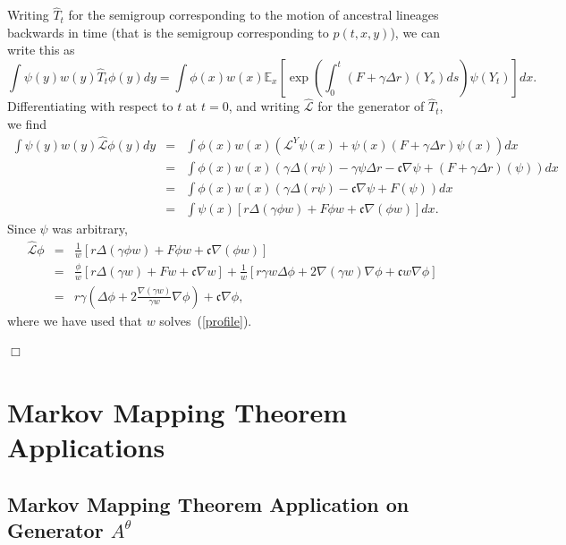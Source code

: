 \documentclass[12pt]{article}
\newenvironment {proof}{{\noindent\bf Proof }}{\hfill $\Box$ \medskip}
\def \hat{\widehat}
\newcommand{\IE}{\mathbb E}
\begin{document}
\begin{proof}
Writing $\hat{T}_t$ for the semigroup corresponding to the motion of 
ancestral lineages backwards in time (that is the semigroup corresponding
to $p(t,x,y)$), we can write this as 
$$\int \psi(y)w(y)\hat{T}_t\phi(y)dy=\int\phi(x)w(x)
\IE_x\left[\exp\left(\int_0^t(F+\gamma\Delta r)(Y_s)ds\right)\psi(Y_t)\right]dx.$$
Differentiating with respect to $t$ at $t=0$, and writing 
$\hat{\mathcal L}$ for the generator of $\hat{T}_t$, we find
\begin{eqnarray*}
\int \psi(y)w(y)\widehat{\mathcal L}\phi(y)dy&=&
\int\phi(x)w(x)\left({\mathcal L}^Y\psi(x)+\psi(x)(F+\gamma\Delta r)\psi(x)\right)dx\\
&=&\int\phi(x)w(x)\left(\gamma\Delta(r\psi)-\gamma\psi\Delta r -\mathfrak{c}\nabla\psi 
+(F+\gamma\Delta r)(\psi)\right)dx\\
&=&\int\phi(x)w(x)\left(\gamma\Delta(r\psi)-\mathfrak{c}\nabla\psi+F(\psi)\right)dx\\
&=&
\int\psi(x)\left[r\Delta(\gamma \phi w)+F\phi w+\mathfrak{c}\nabla(\phi w)\right]dx.
\end{eqnarray*}
Since $\psi$ was arbitrary,
\begin{eqnarray*}
\hat{\mathcal L}\phi&=&\frac{1}{w}\left[ r\Delta (\gamma\phi w)+F\phi w
+\mathfrak{c}\nabla(\phi w)\right]\\
&=&\frac{\phi}{w}\left[r\Delta(\gamma w)+Fw+\mathfrak{c}\nabla w\right]
+\frac{1}{w}\left[r\gamma w\Delta \phi +2\nabla (\gamma w)
\nabla\phi+\mathfrak{c}w\nabla\phi\right]\\
&=&r\gamma\left(\Delta\phi+2\frac{\nabla(\gamma w)}{\gamma w}\nabla\phi\right)
+\mathfrak{c}\nabla\phi,
\end{eqnarray*}
where we have used that $w$ solves~(\ref{profile}).

\end{proof}


\newpage
\appendix
\section{Markov Mapping Theorem Applications}
    \label{sec: Markov Mapping Theorem Application}
\subsection{Markov Mapping Theorem Application on Generator $A^{\theta}$}\label{sec: Markov Mapping Theorem Application - Prelimit}
\end{document}

